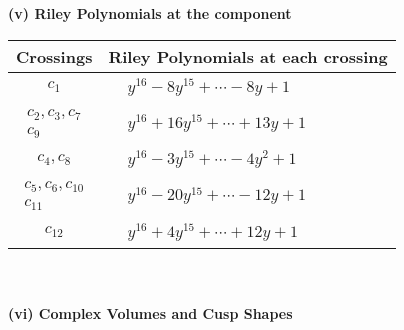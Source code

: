 \documentclass[1p]{elsarticle_modified}
\theoremstyle{definition}
\begin{document}
\newpage\renewcommand{\arraystretch}{1}
\flushleft \textbf{(v) Riley Polynomials at the component}\newline \\
\begin{tabular}{m{50pt}|m{274pt}}
Crossings & \hspace{64pt}Riley Polynomials at each crossing \\
\hline $$\begin{aligned}c_{1}\end{aligned}$$&$\begin{aligned}
&y^{16}-8 y^{15}+\cdots-8 y+1
\end{aligned}$\\
\hline $$\begin{aligned}c_{2},c_{3},c_{7}\\c_{9}\end{aligned}$$&$\begin{aligned}
&y^{16}+16 y^{15}+\cdots+13 y+1
\end{aligned}$\\
\hline $$\begin{aligned}c_{4},c_{8}\end{aligned}$$&$\begin{aligned}
&y^{16}-3 y^{15}+\cdots-4 y^2+1
\end{aligned}$\\
\hline $$\begin{aligned}c_{5},c_{6},c_{10}\\c_{11}\end{aligned}$$&$\begin{aligned}
&y^{16}-20 y^{15}+\cdots-12 y+1
\end{aligned}$\\
\hline $$\begin{aligned}c_{12}\end{aligned}$$&$\begin{aligned}
&y^{16}+4 y^{15}+\cdots+12 y+1
\end{aligned}$\\
\hline
\end{tabular}\\~\\
\newpage\flushleft \textbf{(vi) Complex Volumes and Cusp Shapes}
\end{document}
